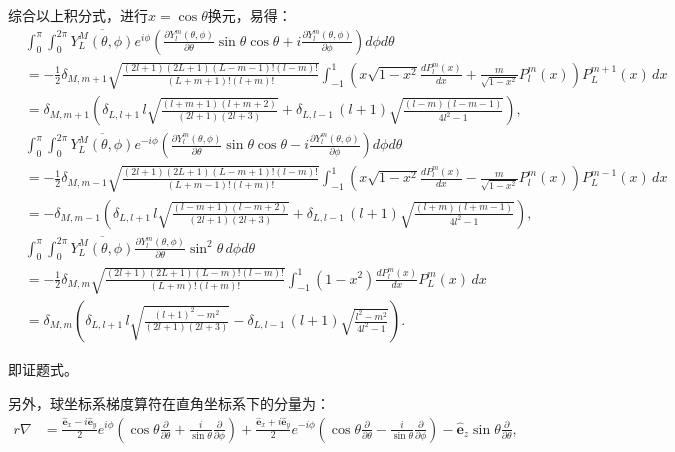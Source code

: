 \documentclass{article}
\begin{document}
	综合以上积分式，进行$x=\cos\theta$换元，易得：
	\begin{align*}
		&\int_0^\pi\int_0^{2\pi} \overline{Y_{L}^{M}(\theta, \phi)}e^{i\phi}\left(\frac{\partial Y_{l}^{m}(\theta,\phi)}{\partial\theta}\sin\theta\cos\theta+i\frac{\partial Y_{l}^{m}(\theta,\phi)}{\partial\phi}\right) d\phi d\theta\\
		&=-\frac{1}{2}\delta_{M,m+1}\sqrt{\frac{(2l+1)(2L+1)(L-m-1)!(l-m)!}{(L+m+1)!(l+m)!}}\int_{-1}^{1}\left(x\sqrt{1-x^2}\frac{dP_l^m(x)}{dx}+\frac{m}{\sqrt{1-x^2}}P_l^m(x)\right)P_L^{m+1}(x)\,dx\\[6pt]
		&=\delta_{M,m+1}\left(\delta_{L,l+1}\,l\sqrt{\frac{(l+m+1)(l+m+2)}{(2l+1)(2l+3)}}+\delta_{L,l-1}\,(l+1)\sqrt{\frac{(l-m)(l-m-1)}{4l^2-1}}\right),\\[12pt]
		&\int_0^\pi\int_0^{2\pi}  \overline{Y_{L}^{M}(\theta, \phi)}e^{-i\phi}\left(\frac{\partial Y_{l}^{m}(\theta,\phi)}{\partial\theta}\sin\theta\cos\theta - i\frac{\partial Y_{l}^{m}(\theta,\phi)}{\partial\phi}\right) d\phi d\theta\\
		&=-\frac{1}{2}\delta_{M,m-1}\sqrt{\frac{(2l+1)(2L+1)(L-m+1)!(l-m)!}{(L+m-1)!(l+m)!}}\int_{-1}^{1}\left(x\sqrt{1-x^2}\frac{dP_l^m(x)}{dx}-\frac{m}{\sqrt{1-x^2}}P_l^m(x)\right)P_L^{m-1}(x)\,dx\\[6pt]
		&=-\delta_{M,m-1}\left(\delta_{L,l+1}\,l\sqrt{\frac{(l-m+1)(l-m+2)}{(2l+1)(2l+3)}}+\delta_{L,l-1}\,(l+1)\sqrt{\frac{(l+m)(l+m-1)}{4l^2-1}}\right),\\[12pt]
		&\int_0^\pi\int_0^{2\pi}  \overline{Y_{L}^{M}(\theta, \phi)}\frac{\partial Y_{l}^{m}(\theta,\phi)}{\partial\theta}\sin^2\theta\, d\phi d\theta\\
		&=-\frac{1}{2}\delta_{M,m}\sqrt{\frac{(2l+1)(2L+1)(L-m)!(l-m)!}{(L+m)!(l+m)!}}\int_{-1}^{1}(1-x^2)\frac{dP_l^m(x)}{dx}P_L^m(x)\,dx\\[6pt]
		&=\delta_{M,m}\left(\delta_{L,l+1}\,l\sqrt{\frac{(l+1)^2-m^2}{(2l+1)(2l+3)}}-\delta_{L,l-1}\,(l+1)\sqrt{\frac{l^2-m^2}{4l^2-1}}\right).
	\end{align*}
	
	即证题式。
	
	另外，球坐标系梯度算符在直角坐标系下的分量为：
	\begin{align*}
		r\nabla &= \frac{\hat{\bm{e}}_x - i\hat{\bm{e}}_y}{2}e^{i\phi}\left(\cos\theta\frac{\partial}{\partial\theta}+\frac{i}{\sin\theta}\frac{\partial}{\partial\phi}\right)+\frac{\hat{\bm{e}}_x + i\hat{\bm{e}}_y}{2}e^{-i\phi}\left(\cos\theta\frac{\partial}{\partial\theta}-\frac{i}{\sin\theta}\frac{\partial}{\partial\phi}\right)-\hat{\bm{e}}_z\sin\theta\frac{\partial}{\partial\theta},
	\end{align*}
	
\end{document}
